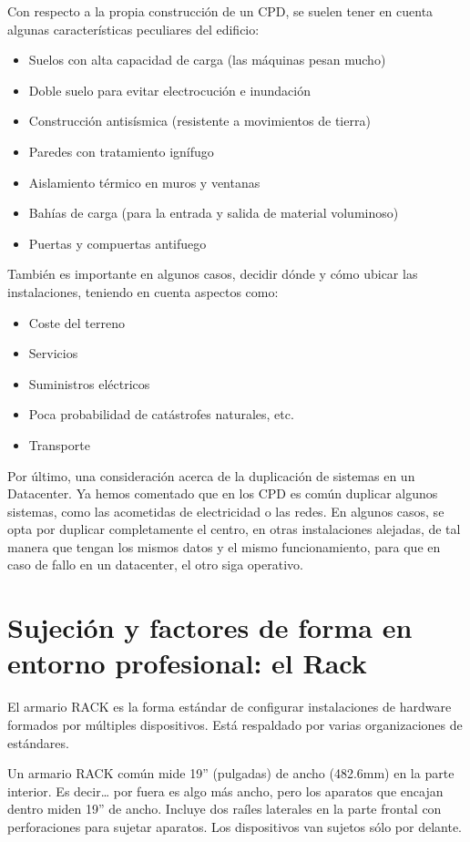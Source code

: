 \documentclass{article}
\begin{document}
Con respecto a la propia construcción de un CPD, se suelen tener en cuenta algunas características peculiares del edificio:
\begin{itemize}
\item Suelos con alta capacidad de carga (las máquinas pesan mucho)
\item Doble suelo para evitar electrocución e inundación
\item Construcción antisísmica (resistente a movimientos de tierra)
\item Paredes con tratamiento ignífugo
\item Aislamiento térmico en muros y ventanas
\item Bahías de carga (para la entrada y salida de material voluminoso)
\item Puertas y compuertas antifuego
\end{itemize}

También es importante en algunos casos, decidir dónde y cómo ubicar las instalaciones, teniendo en cuenta aspectos como:
\begin{itemize}
\item Coste del terreno
\item Servicios
\item Suministros eléctricos
\item Poca probabilidad de catástrofes naturales, etc.
\item Transporte
\end{itemize}


Por último, una consideración acerca de la duplicación de sistemas en un Datacenter. Ya hemos comentado que en los CPD es común duplicar algunos sistemas, como las acometidas de electricidad o las redes. En algunos casos, se opta por duplicar completamente el centro, en otras instalaciones alejadas, de tal manera que tengan los mismos datos y el mismo funcionamiento, para que en caso de fallo en un datacenter, el otro siga operativo.

\section{Sujeción y factores de forma en entorno profesional: el Rack}
\label{sec:org56dc937}
El armario RACK es la forma estándar de configurar instalaciones de hardware formados por múltiples dispositivos. Está respaldado por varias organizaciones de estándares.

Un armario RACK común mide 19” (pulgadas) de ancho (482.6mm) en la parte interior. Es decir\ldots{} por fuera es algo más ancho, pero los aparatos que encajan dentro miden 19” de ancho. Incluye dos raíles laterales en la parte frontal con perforaciones para sujetar aparatos. Los dispositivos van sujetos sólo por delante.
\end{document}
